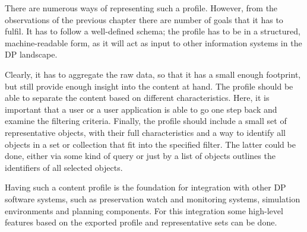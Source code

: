 There are numerous ways of representing such a profile. However, from the observations of the previous chapter there are number of goals that it has to fulfil. It has to follow a well-defined schema; the profile has to be in a structured, machine-readable form, as it will act as input to other information systems in the DP landscape.

Clearly, it has to aggregate the raw data, so that it has a small enough footprint, but still provide enough insight into the content at hand. The profile should be able to separate the content based on different characteristics. Here, it is important that a user or a user application is able to go one step back and examine the filtering criteria. Finally, the profile should include a small set of representative objects, with their full characteristics and a way to identify all objects in a set or collection that fit into the specified filter. The latter could be done, either via some kind of query or just by a list of objects outlines the identifiers of all selected objects.

Having such a content profile is the foundation for integration with other DP software systems, such as preservation watch and monitoring systems, simulation environments and planning components. For this integration some high-level features based on the exported profile and representative sets can be done.

